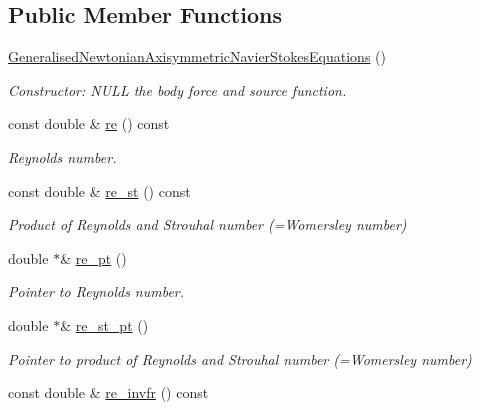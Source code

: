 \subsection*{Public Member Functions}
\begin{DoxyCompactItemize}
\item 
\hyperlink{classoomph_1_1GeneralisedNewtonianAxisymmetricNavierStokesEquations_a6feed4589ec4f478f1dd2def7b026cbe}{Generalised\+Newtonian\+Axisymmetric\+Navier\+Stokes\+Equations} ()
\begin{DoxyCompactList}\small\item\em Constructor\+: N\+U\+LL the body force and source function. \end{DoxyCompactList}\item 
const double \& \hyperlink{classoomph_1_1GeneralisedNewtonianAxisymmetricNavierStokesEquations_a70c3b671d2cefa468648267556261a7b}{re} () const
\begin{DoxyCompactList}\small\item\em Reynolds number. \end{DoxyCompactList}\item 
const double \& \hyperlink{classoomph_1_1GeneralisedNewtonianAxisymmetricNavierStokesEquations_a47f4d5087ab1703e6bca4fc16f90800a}{re\+\_\+st} () const
\begin{DoxyCompactList}\small\item\em Product of Reynolds and Strouhal number (=Womersley number) \end{DoxyCompactList}\item 
double $\ast$\& \hyperlink{classoomph_1_1GeneralisedNewtonianAxisymmetricNavierStokesEquations_ae89ec914462c44858c6d37e907a8e261}{re\+\_\+pt} ()
\begin{DoxyCompactList}\small\item\em Pointer to Reynolds number. \end{DoxyCompactList}\item 
double $\ast$\& \hyperlink{classoomph_1_1GeneralisedNewtonianAxisymmetricNavierStokesEquations_a39d6b323135260e4b332a6743d37d201}{re\+\_\+st\+\_\+pt} ()
\begin{DoxyCompactList}\small\item\em Pointer to product of Reynolds and Strouhal number (=Womersley number) \end{DoxyCompactList}\item 
const double \& \hyperlink{classoomph_1_1GeneralisedNewtonianAxisymmetricNavierStokesEquations_a5023436b76ee4d521463c52ea8136592}{re\+\_\+invfr} () const

\end{DoxyCompactItemize}
